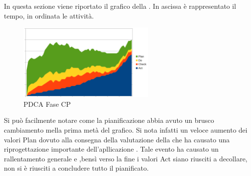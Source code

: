 In questa sezione viene riportato il grafico  della . In ascissa è rappresentato il tempo, in ordinata le attività.

\begin{figure}[H]
	\centering
	\includegraphics[width=0.6\textwidth]{PianoDiQualifica/Pics/GraficoPDCAFaseCP.png}
	\caption{PDCA Fase CP}
\end{figure}
Si può facilmente notare come la pianificazione abbia avuto un brusco cambiamento mella prima metà del grafico. Si nota infatti un veloce aumento dei valori Plan dovuto alla consegna della valutazione della  che ha causato una riprogettazione importante dell'apllicazione . Tale evento ha causato un rallentamento generale e ,bensì verso la fine i valori Act siano riusciti a decollare, non si è riusciti a concludere tutto il pianificato.